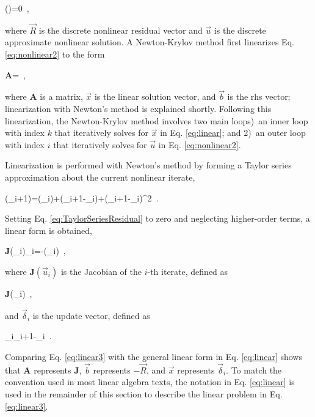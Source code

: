 \beq
\label{eq:nonlinear2}
()=0\ ,
\eeq

\noindent where \(\vec{R}\) is the discrete nonlinear residual vector and \(\vec{u}\) is the discrete approximate nonlinear solution. A Newton-Krylov method first linearizes Eq. \eqref{eq:nonlinear2} to the form

\beq
\label{eq:linear}
\textbf{A}=\ ,
\eeq

\noindent where \(\textbf{A}\) is a matrix, \(\vec{x}\) is the linear solution vector, and \(\vec{b}\) is the \gls{rhs} vector; linearization with Newton's method is explained shortly. Following this linearization, the Newton-Krylov method involves two main loops)~an inner loop with index \(k\) that iteratively solves for \(\vec{x}\) in Eq. \eqref{eq:linear}; and 2)~an outer loop with index \(i\) that iteratively solves for \(\vec{u}\) in Eq. \eqref{eq:nonlinear2}.

Linearization is performed with Newton's method by forming a Taylor series approximation about the current nonlinear iterate,

\beq
\label{eq:TaylorSeriesResidual}
(_{i+1})=(_i)+(_{i+1}-_i)+(_{i+1}-_i)^2\ .
\eeq

\noindent Setting Eq. \eqref{eq:TaylorSeriesResidual} to zero and neglecting higher-order terms, a linear form is obtained,

\beq
\label{eq:linear3}
\textbf{J}(_i)\vec{\delta}_i=-(_i)\ ,
\eeq

\noindent where \(\textbf{J}(\vec{u}_i)\) is the Jacobian of the \(i\)-th iterate, defined as

\beq
\label{eq:JacobianDef}
\textbf{J}(_i)\equiv{}\ ,
\eeq

\noindent and \(\vec{\delta}_i\) is the update vector, defined as

\beq
\label{eq:update}
\vec{\delta}_i\equiv{}_{i+1}-_i\ .
\eeq

\noindent Comparing Eq. \eqref{eq:linear3} with the general linear form in Eq. \eqref{eq:linear} shows that \textbf{A} represents \(\textbf{J}\), \(\vec{b}\) represents \(-\vec{R}\), and \(\vec{x}\) represents \(\vec{\delta}_i\). To match the convention used in most linear algebra texts, the notation in Eq. \eqref{eq:linear} is used in the remainder of this section to describe the linear problem in Eq. \eqref{eq:linear3}.

